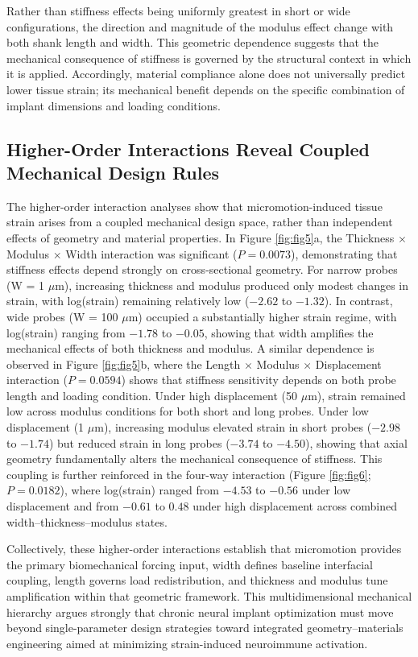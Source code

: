 \documentclass[fleqn,10pt]{wlscirep}
\begin{document}
Rather than stiffness effects being uniformly greatest in short or wide configurations, the direction and magnitude of the modulus effect change with both shank length and width. This geometric dependence suggests that the mechanical consequence of stiffness is governed by the structural context in which it is applied. Accordingly, material compliance alone does not universally predict lower tissue strain; its mechanical benefit depends on the specific combination of implant dimensions and loading conditions.

\subsection{Higher-Order Interactions Reveal Coupled Mechanical Design Rules}
The higher-order interaction analyses show that micromotion-induced tissue strain arises from a coupled mechanical design space, rather than independent effects of geometry and material properties. In Figure \ref{fig:fig5}a, the Thickness $\times$ Modulus $\times$ Width interaction was significant ($P = 0.0073$), demonstrating that stiffness effects depend strongly on cross-sectional geometry. For narrow probes (W = 1 $\mu$m), increasing thickness and modulus produced only modest changes in strain, with log(strain) remaining relatively low ($-2.62$ to $-1.32$). In contrast, wide probes (W = 100 $\mu$m) occupied a substantially higher strain regime, with log(strain) ranging from $-1.78$ to $-0.05$, showing that width amplifies the mechanical effects of both thickness and modulus. A similar dependence is observed in Figure \ref{fig:fig5}b, where the Length $\times$ Modulus $\times$ Displacement interaction ($P = 0.0594$) shows that stiffness sensitivity depends on both probe length and loading condition. Under high displacement (50 $\mu$m), strain remained low across modulus conditions for both short and long probes. Under low displacement (1 $\mu$m), increasing modulus elevated strain in short probes ($-2.98$ to $-1.74$) but reduced strain in long probes ($-3.74$ to $-4.50$), showing that axial geometry fundamentally alters the mechanical consequence of stiffness. This coupling is further reinforced in the four-way interaction (Figure \ref{fig:fig6}; $P = 0.0182$), where log(strain) ranged from $-4.53$ to $-0.56$ under low displacement and from $-0.61$ to $0.48$ under high displacement across combined width--thickness--modulus states.

Collectively, these higher-order interactions establish that micromotion provides the primary biomechanical forcing input, width defines baseline interfacial coupling, length governs load redistribution, and thickness and modulus tune amplification within that geometric framework. This multidimensional mechanical hierarchy argues strongly that chronic neural implant optimization must move beyond single-parameter design strategies toward integrated geometry--materials engineering aimed at minimizing strain-induced neuroimmune activation.
\end{document}
